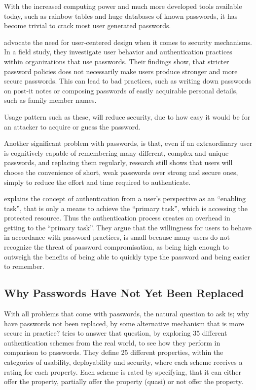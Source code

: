 With the increased computing power and much more developed tools available today, such as rainbow tables \cite{oechslin2003making} and huge databases of known passwords, it has become trivial to crack most user generated passwords.


\citet{adams1999users} advocate the need for user-centered design when it comes to security mechanisms.
In a field study, they investigate user behavior and authentication practices within organizations that use passwords.
Their findings show, that stricter password policies does not necessarily make users produce stronger and more secure passwords. This can lead to bad practices, such as writing down passwords on post-it notes or composing passwords of easily acquirable personal details, such as family member names.

Usage pattern such as these, will reduce security, due to how easy it would be for an attacker to acquire or guess the password.

Another significant problem with passwords, is that, even if an extraordinary user is cognitively capable of remembering many different, complex and unique passwords, and replacing them regularly, research still shows that users will choose the convenience of short, weak passwords over strong and secure ones, simply to reduce the effort and time required to authenticate.

\citet{weirich2001pretty} explains the concept of authentication from a user's perspective as an ``enabling task'', that is only a means to achieve the ``primary task'', which is accessing the protected resource.
Thus the authentication process creates an overhead in getting to the ``primary task''.
They argue that the willingness for users to behave in accordance with password practices, is small because many users do not recognize the threat of password compromisation, as being high enough to outweigh the benefits of being able to quickly type the password and being easier to remember.


\subsection{Why Passwords Have Not Yet Been Replaced}\label{sec:why}

With all problems that come with passwords, the natural question to ask is; why have passwords not been replaced, by some alternative mechanism that is more secure in practice?
\citet{bonneau2012quest} tries to answer that question, by exploring 35 different authentication schemes from the real world, to see how they perform in comparison to passwords.
They define 25 different properties, within the categories of usability, deployability and security, where each scheme receives a rating for each property.
Each scheme is rated by specifying, that it can either offer the property, partially offer the property (quasi) or not offer the property.


